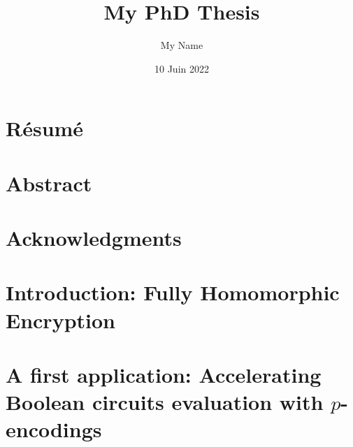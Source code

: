 \documentclass[11pt, twoside, openright]{thesis}
\title{My PhD Thesis}
\institute{l’École Normale Supérieure de Paris}
\author{My Name}
\date{10 Juin 2022}
\begin{document}
\frontmatter 
\hypersetup{pageanchor=false}
\maketitle
\hypersetup{pageanchor=true}
\dominitoc



\cleardoublepage
\chapter*{Résumé}
\thefrabstract{}
\vfill
\thefrkeywords{}
\cleardoublepage
\chapter*{Abstract}
\theenabstract{}
\vfill
\theenkeywords{}

\cleardoublepage
\chapter*{Acknowledgments}

\cleardoublepage
\hypertarget{contents}{}
\tableofcontents


\mainmatter



\chapter{Introduction: Fully Homomorphic Encryption}








\chapter{A first application: Accelerating Boolean circuits evaluation with $p$-encodings}
\end{document}
